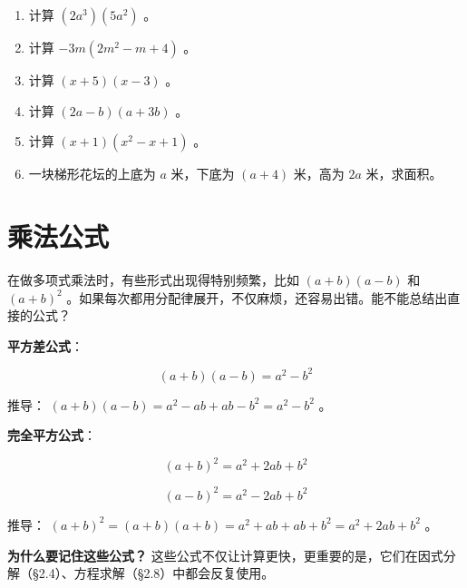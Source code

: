 \begin{practice}


\begin{enumerate}
  \item 计算 $(2a^3)(5a^2)$ 。
  \item 计算 $-3m(2m^2 - m + 4)$ 。
  \item 计算 $(x + 5)(x - 3)$ 。
  \item 计算 $(2a - b)(a + 3b)$ 。
  \item 计算 $(x + 1)(x^2 - x + 1)$ 。
  \item 一块梯形花坛的上底为 $a$ 米，下底为 $(a + 4)$ 米，高为 $2a$ 米，求面积。
\end{enumerate}


\end{practice}

\section*{乘法公式}


\begin{explore}


在做多项式乘法时，有些形式出现得特别频繁，比如 $(a + b)(a - b)$ 和 $(a + b)^2$ 。如果每次都用分配律展开，不仅麻烦，还容易出错。能不能总结出直接的公式？

\end{explore}

\begin{understand}


\textbf{平方差公式}：

\[
(a + b)(a - b) = a^2 - b^2
\]


推导： $(a + b)(a - b) = a^2 - ab + ab - b^2 = a^2 - b^2$ 。

\textbf{完全平方公式}：

\[
(a + b)^2 = a^2 + 2ab + b^2
\]


\[
(a - b)^2 = a^2 - 2ab + b^2
\]


推导： $(a + b)^2 = (a + b)(a + b) = a^2 + ab + ab + b^2 = a^2 + 2ab + b^2$ 。

\textbf{为什么要记住这些公式？} 这些公式不仅让计算更快，更重要的是，它们在因式分解（§2.4）、方程求解（§2.8）中都会反复使用。

\end{understand}

